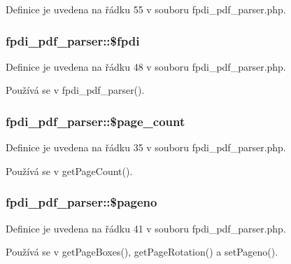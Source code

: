 Definice je uvedena na řádku 55 v souboru fpdi\-\_\-pdf\-\_\-parser.\-php.

\hypertarget{classfpdi__pdf__parser_af23f9ff9cf32224e3e0eb2b8948b92d4}{
\subsubsection[{\$fpdi}]{\setlength{\rightskip}{0pt plus 5cm}fpdi\-\_\-pdf\-\_\-parser\-::\$fpdi}}\label{classfpdi__pdf__parser_af23f9ff9cf32224e3e0eb2b8948b92d4}


Definice je uvedena na řádku 48 v souboru fpdi\-\_\-pdf\-\_\-parser.\-php.



Používá se v fpdi\-\_\-pdf\-\_\-parser().

\hypertarget{classfpdi__pdf__parser_ac8722ca731ad84acb63ff1afaed504cc}{
\subsubsection[{\$page\-\_\-count}]{\setlength{\rightskip}{0pt plus 5cm}fpdi\-\_\-pdf\-\_\-parser\-::\$page\-\_\-count}}\label{classfpdi__pdf__parser_ac8722ca731ad84acb63ff1afaed504cc}


Definice je uvedena na řádku 35 v souboru fpdi\-\_\-pdf\-\_\-parser.\-php.



Používá se v get\-Page\-Count().

\hypertarget{classfpdi__pdf__parser_ab3c5c997cdad564a2bbdd1fb4cc486e3}{
\subsubsection[{\$pageno}]{\setlength{\rightskip}{0pt plus 5cm}fpdi\-\_\-pdf\-\_\-parser\-::\$pageno}}\label{classfpdi__pdf__parser_ab3c5c997cdad564a2bbdd1fb4cc486e3}


Definice je uvedena na řádku 41 v souboru fpdi\-\_\-pdf\-\_\-parser.\-php.



Používá se v get\-Page\-Boxes(), get\-Page\-Rotation() a set\-Pageno().

